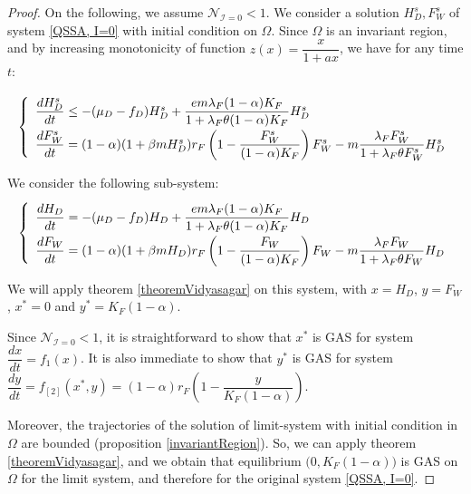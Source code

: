 \documentclass{article}
\newcommand{\lfw}{\lambda_{F}}
\newcommand{\lfw}{\lambda_{F}}
\newcommand{\cI}{\mathcal{I}}
\begin{document}
\begin{proof}
On the following, we assume $\mathcal{N}_{\cI = 0} < 1$. We consider a solution $H_D^s, F_W^s$ of system \eqref{QSSA, I=0} with initial condition on $\Omega$. Since $\Omega$ is an invariant region, and by increasing monotonicity of function $z(x) = \dfrac{x}{1 + a x}$, we have for any time $t$:

\begin{equation*}
\def\arraystretch{2}
\left\lbrace \begin{array}{l}
\dfrac{dH_D^s}{dt} \leq -(\mu_D - f_D) H_D^s + \dfrac{e m \lfw (1-\alpha) K_F}{1 + \lfw \theta (1-\alpha) K_F} H_D^s \\
\dfrac{dF_W^s}{dt} = (1-\alpha) (1+\beta m H_D^s) r_F \left(1 - \dfrac{F_W^s}{(1-\alpha)K_F} \right) F_W^s - m \dfrac{\lfw F_W^s}{1 + \lfw \theta F_W^s} H_D^s \\
\end{array} \right.
\end{equation*}

We consider the following sub-system:
\begin{equation}
\def\arraystretch{2}
\left\lbrace \begin{array}{l}
\dfrac{dH_D}{dt} = -(\mu_D - f_D) H_D + \dfrac{e m \lfw (1-\alpha) K_F}{1 + \lfw \theta (1-\alpha) K_F} H_D \\
\dfrac{dF_W}{dt} = (1-\alpha) (1+\beta m H_D) r_F \left(1 - \dfrac{F_W}{(1-\alpha)K_F} \right) F_W - m \dfrac{\lfw F_W}{1 + \lfw \theta F_W} H_D \\
\end{array} \right.
\label{EEF, limit system}
\end{equation}

We will apply theorem \ref{theoremVidyasagar} on this system, with $x = H_D$, $y = F_W$, $x^* = 0$ and $y^* = K_F(1- \alpha)$.

Since $\mathcal{N}_{\cI = 0} < 1$, it is straightforward to show that $x^*$ is GAS for system $\dfrac{dx}{dt} = f_1(x)$. It is also immediate to show that $y^*$ is GAS for system $\dfrac{dy}{dt} = f_{[2]}(x^*, y) = (1-\alpha) r_F \left(1 - \dfrac{y}{K_F(1-\alpha)} \right) $. 

Moreover, the trajectories of the solution of limit-system \label{EEF, limit system} with initial condition in $\Omega$ are bounded (proposition \ref{invariantRegion}). So, we can apply theorem \ref{theoremVidyasagar}, and we obtain that equilibrium $\Big(0, K_F(1-\alpha) \Big)$ is GAS on $\Omega$ for the limit system, and therefore for the original system \eqref{QSSA, I=0}.
\end{proof}
\end{document}

